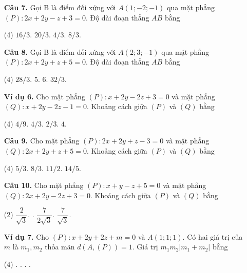 \documentclass[12pt, a4paper]{article}
\begin{document}
\begin{enumerate}[label=\textbf{\arabic*.}, wide=0pt, leftmargin=*]
    \item[\textbf{Câu 7.}] Gọi B là điểm đối xứng với \(A(1;-2;-1)\) qua mặt phẳng \((P) : 2x + 2y - z + 3 = 0\). Độ dài đoạn thẳng \(AB\) bằng
    \begin{tasks}(4)
        \task \(16/3\).
        \task \(20/3\).
        \task \(4/3\).
        \task \(8/3\).
    \end{tasks}
    
    \item[\textbf{Câu 8.}] Gọi B là điểm đối xứng với \(A(2;3;-1)\) qua mặt phẳng \((P) : 2x + 2y + z + 5 = 0\). Độ dài đoạn thẳng \(AB\) bằng
    \begin{tasks}(4)
        \task \(28/3\).
        \task \(5\).
        \task \(6\).
        \task \(32/3\).
    \end{tasks}

    \item[\textbf{Ví dụ 6.}] Cho mặt phẳng \((P) : x + 2y - 2z + 3 = 0\) và mặt phẳng \((Q) : x + 2y - 2z - 1 = 0\). Khoảng cách giữa \((P)\) và \((Q)\) bằng
    \begin{tasks}(4)
        \task \(4/9\).
        \task \(4/3\).
        \task \(2/3\).
        \task \(4\).
    \end{tasks}
    
    \item[\textbf{Câu 9.}] Cho mặt phẳng \((P) : 2x + 2y + z - 3 = 0\) và mặt phẳng \((Q) : 2x + 2y + z + 5 = 0\). Khoảng cách giữa \((P)\) và \((Q)\) bằng
    \begin{tasks}(4)
        \task \(5/3\).
        \task \(8/3\).
        \task \(11/2\).
        \task \(14/5\).
    \end{tasks}
    
    \item[\textbf{Câu 10.}] Cho mặt phẳng \((P) : x + y - z + 5 = 0\) và mặt phẳng \((Q) : 2x + 2y - 2z + 3 = 0\). Khoảng cách giữa \((P)\) và \((Q)\) bằng
    \begin{tasks}(2)
        \task \(\dfrac{2}{\sqrt{3}}\).
        .
        \task \(\dfrac{7}{2\sqrt{3}}\).
        \task \(\dfrac{7}{\sqrt{3}}\).
    \end{tasks}
    
    \item[\textbf{Ví dụ 7.}] Cho \((P): x + 2y + 2z + m = 0\) và \(A(1;1;1)\). Có hai giá trị của \(m\) là \(m_1, m_2\) thỏa mãn \(d(A, (P)) = 1\). Giá trị \(m_1 m_2 |m_1 + m_2|\) bằng
    \begin{tasks}(4)
        .
        .
        .
        .
    \end{tasks}
    

\end{enumerate}
\end{document}

